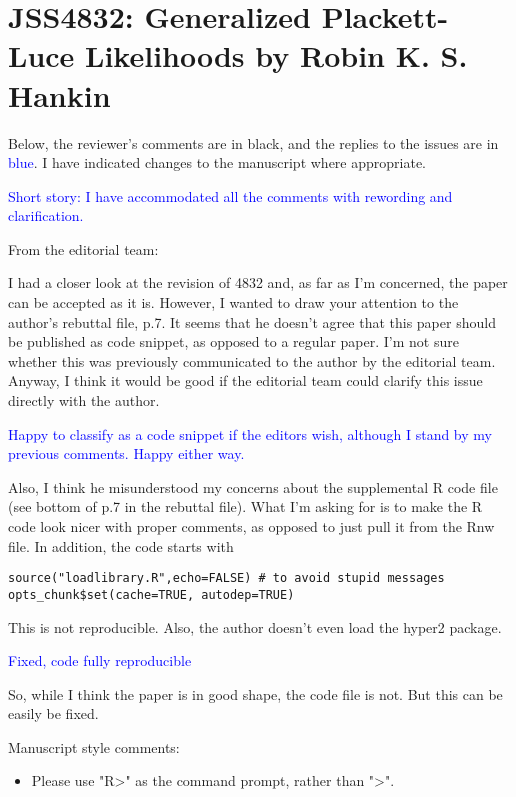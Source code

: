 \documentclass[12pt]{article}
\begin{document}
\section*{JSS4832: Generalized Plackett-Luce Likelihoods by Robin
K. S. Hankin}


Below, the reviewer's comments are in black, and the replies to the
issues are in \textcolor{blue}{blue}.  I have indicated changes to
the manuscript where appropriate.

\textcolor{blue}{Short story: I have accommodated all the comments with
rewording and clarification.}

From the editorial team:

I had a closer look at the revision of 4832 and, as far as I'm
concerned, the paper can be accepted as it is. However, I wanted to
draw your attention to the author's rebuttal file, p.7. It seems that
he doesn't agree that this paper should be published as code snippet,
as opposed to a regular paper. I'm not sure whether this was
previously communicated to the author by the editorial team. Anyway, I
think it would be good if the editorial team could clarify this issue
directly with the author.

\textcolor{blue}{Happy to classify as a code snippet if the editors
  wish, although I stand by my previous comments.  Happy either way.}


Also, I think he misunderstood my concerns about the supplemental R
code file (see bottom of p.7 in the rebuttal file). What I'm asking
for is to make the R code look nicer with proper comments, as opposed
to just pull it from the Rnw file. In addition, the code starts with


\begin{verbatim}
source("loadlibrary.R",echo=FALSE) # to avoid stupid messages
opts_chunk$set(cache=TRUE, autodep=TRUE)
\end{verbatim}

This is not reproducible. Also, the author doesn't even load the hyper2 package.

\textcolor{blue}{Fixed, code fully reproducible}

So, while I think the paper is in good shape, the code file is not. But this can be easily be fixed.

Manuscript style comments:

\begin{itemize}
  \item Please use "R>" as the command prompt, rather than ">".
\end{itemize}
    
\end{document}
